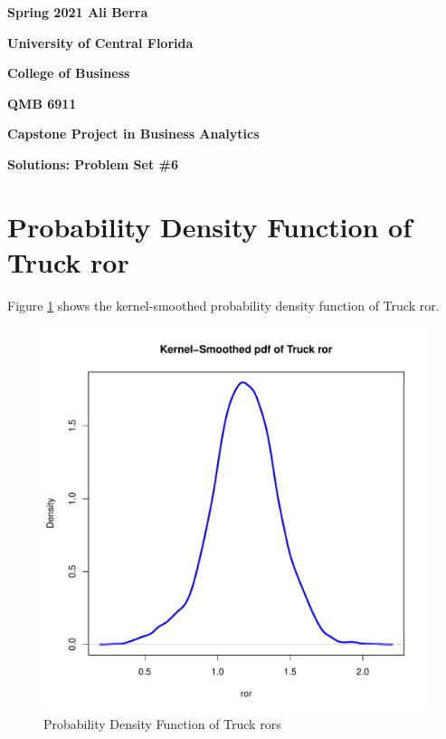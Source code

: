 \documentclass[11pt]{book}
\begin{document}

\pagestyle{empty}
{\noindent\bf Spring 2021 \hfill Ali Berra}
\vskip 16pt
\centerline{\bf University of Central Florida}
\centerline{\bf College of Business}
\vskip 16pt
\centerline{\bf QMB 6911}
\centerline{\bf Capstone Project in Business Analytics}
\vskip 10pt
\centerline{\bf Solutions:  Problem Set \#6}
\vskip 32pt
\noindent




\pagebreak
\section*{Probability Density Function of Truck ror}

Figure \ref{fig:density_ror} shows  the kernel-smoothed probability density function of Truck ror.

\begin{figure}[h!]
  \centering
  \includegraphics[scale = 0.5, keepaspectratio=true]{../Figures/density_ror}
  \caption{Probability Density Function of Truck rors} \label{fig:density_ror}
\end{figure}
\end{document}
